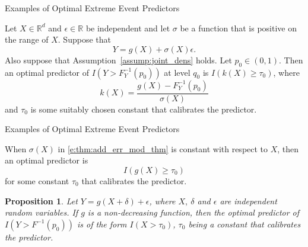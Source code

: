 \documentclass{beamer}
\newtheorem{proposition}{Proposition}
\def\R{\mathbb R}
\begin{document}
\begin{frame}{Examples of Optimal Extreme Event Predictors}
    \begin{theorem}\label{thm:add_err_mod_thm}
        Let $X \in \R^d$ and $\epsilon \in \R$ be independent and let $\sigma$ be a function that is positive on the range of $X$. Suppose that 
        \begin{equation}\label{e:thm:add_err_mod_thm}
        Y = g(X) + \sigma(X)\epsilon.
        \end{equation}
        Also suppose that Assumption~\ref{assump:joint_dens} holds. Let $p_0 \in (0, 1)$. Then an optimal predictor of $I(Y > F_Y^{-1}(p_0))$ at level $q_0$ is $I(k(X) \ge \tau_0)$, where
        \[
        k(X) = \frac{g(X) - F_Y^{-1}(p_0)}{\sigma(X)}
        \]
        and $\tau_0$ is some suitably chosen constant that calibrates the predictor.
    \end{theorem}
\end{frame}

\begin{frame}{Examples of Optimal Extreme Event Predictors}
    \begin{corollary}
        When $\sigma(X)$ in \eqref{e:thm:add_err_mod_thm} is constant with respect to $X$, then an optimal predictor is
        \[
        I(g(X) \ge \tau_0)
        \]
        for some constant $\tau_0$ that calibrates the predictor.
    \end{corollary}

    \begin{proposition} \label{p:monotone-link}
        Let $Y = g(X + \delta) + \epsilon$, where $X,\ \delta$ and $\epsilon$ are independent random
        variables. If $g$ is a non-decreasing function, then the optimal predictor of $I(Y > F^{-1}(p_0))$ is of the form $I(X > \tau_0)$, $\tau_0$ being a constant that calibrates the predictor.
    \end{proposition}
\end{frame}
\end{document}
